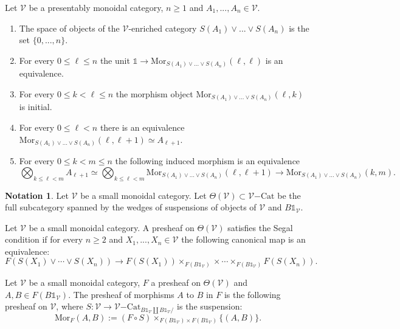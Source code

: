 \documentclass[10pt,oneside]{article}
\numberwithin{equation}{section} %
\numberwithin{figure}{section} %
\theoremstyle{plain}
\theoremstyle{definition}
\newtheorem{notation}[thm]{Notation}
\newcommand{\mV}{{\mathcal V}}
\newcommand{\A}{A}
\newcommand{\m}{{m}}
\newcommand{\bk}{{k}}
\newcommand{\n}{{n}}
\newcommand{\Cat}{\mathrm{Cat}}
\newcommand{\tu}{{\mathbb 1}}
\newcommand{\Mor}{{\mathrm{Mor}}}
\begin{document}
\begin{corollary}

Let $\mV$ be a presentably monoidal category, $n \geq 1$ and $\A_1, ..., \A_\n \in \mV$.
\begin{enumerate}[\normalfont(1)]\setlength{\itemsep}{-2pt}
\item The space of objects of the $\mV$-enriched category $S(A_1) \vee ...\vee S(A_n)$ is the set $\{0,...,\n\}.$
\item For every $0 \leq \ell \leq \n$ the unit $\tu \to \Mor_{S(A_1) \vee ...\vee S(A_n)}(\ell,\ell)$ is an equivalence.
\item For every $0 \leq \bk < \ell \leq \n$ the morphism object $\Mor_{S(A_1) \vee ...\vee S(A_n)}(\ell,\bk)$ is initial.
\item For every $0 \leq \ell < \n$ there is an equivalence $ \Mor_{S(A_1) \vee ...\vee S(A_n)}(\ell,\ell+1) \simeq \A_{\ell+1}$. 
\item For every $0 \leq \bk < \m \leq \n$ the following induced morphism is an equivalence $$\bigotimes_{\bk \leq \ell < \m}  \A_{\ell+1} \simeq \bigotimes_{\bk \leq \ell < \m} \Mor_{S(A_1) \vee ...\vee S(A_n)}(\ell,\ell+1) \to \Mor_{S(A_1) \vee ...\vee S(A_n)}(\bk,\m).$$
\end{enumerate}
\end{corollary}



\begin{notation}\label{Thetasgen}Let $\mV$ be a small monoidal category. Let $\Theta(\mV) \subset \mV\mathrm{-}\Cat$ be the full subcategory spanned by the wedges of suspensions of objects of $\mV$ and $B\tu_\mV$.

\end{notation}

\begin{definition}

Let $\mV$ be a small monoidal category.
A presheaf on $\Theta(\mV) $ satisfies the Segal condition 
if for every $n \geq 2$ and $X_1,...,X_n \in \mV$
the following canonical map is an equivalence:
$$ F(S(X_1) \vee\cdots\vee S(X_n)) \to F(S(X_1)) \times_{F(B\tu_\mV)}\times\cdots \times_{F(B\tu_\mV)} F(S(X_n)).$$
    
\end{definition}




\begin{definition}Let $\mV$ be a small monoidal category, $F$ a presheaf on $\Theta(\mV)$ and $A,B \in F(B\tu_\mV). $ 
The presheaf of morphisms $A$ to $B$ in $F$ is the following presheaf on $\mV$, where $S: \mV \to \mV\mathrm{-}\Cat_{B\tu_\mV \coprod B\tu_\mV/}$ is the suspension:
$$\Mor_F(A,B):= (F \circ S) \times_{F(B\tu_\mV) \times F(B\tu_\mV)} \{(A,B)\}.$$
    
\end{definition}
\end{document}
